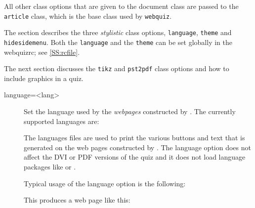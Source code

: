 \documentclass[svgnames]{article}
\newcommand\webquizrc{\index{webquizrc}\textsf{webquizrc}\xspace}
\begin{document}
    All other class options that are given to the \WebQuiz document class
    are passed to the \texttt{article} class, which is the base class used
    by \texttt{webquiz}.

    The section describes the three \textit{stylistic} class options,
    \Verb|language|, \Verb|theme| and \Verb|hidesidemenu|.
    Both the \Verb|language| and the \Verb|theme| can be set globally in
    the \webquizrc; see \autoref{SS:rcfile}.

    The next section discusses the \Verb|tikz| and \Verb|pst2pdf| class
    options and how to include graphics in a quiz.

\begin{description}
  \item[language=<lang>] 
  Set the language used by the \textit{webpages} constructed by \WebQuiz.
  The currently supported languages are:

    \begin{quote}
        
    \end{quote}

    The languages files are used to print the various buttons and text
    that is generated on the web pages constructed by \WebQuiz. The
    \textsf{language} option does not affect the DVI or PDF versions of
    the quiz and it does not load language packages like  or
    .

    Typical usage of the \textsf{language} option is the following:
    
    This produces a web page like this:


\end{description}
\end{document}
